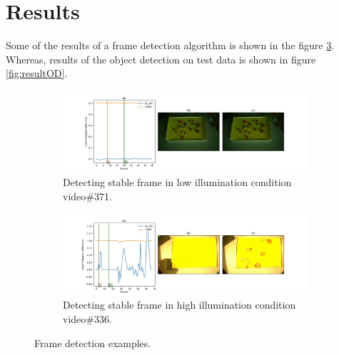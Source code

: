 \documentclass[journal,onecolumn,12pt]{IEEEtran}
\begin{document}
%
%

\section{Results}
Some of the results of a frame detection algorithm is shown in the figure \ref{fig:fd}. Whereas, results of the object detection on test data is shown in figure \ref{fig:resultOD}.
\begin{figure}[h]
	\centering
	\begin{subfigure}[b]{1\textwidth}
		\centering
		\includegraphics[width=\textwidth]{images/frameDetection/fd_371.jpg}
		\caption{Detecting stable frame in low illumination condition video\#371.}
		\label{fig:darkDetect}
	\end{subfigure}
	\begin{subfigure}[b]{1\textwidth}  
		\centering 
		\includegraphics[width=\textwidth]{images/frameDetection/fd_336.jpg}
		\caption{Detecting stable frame in high illumination condition video\#336.}   
		\label{fig:brightDetect}
	\end{subfigure}
	\caption{Frame detection examples.}
	\label{fig:fd}
\end{figure}
\end{document}
